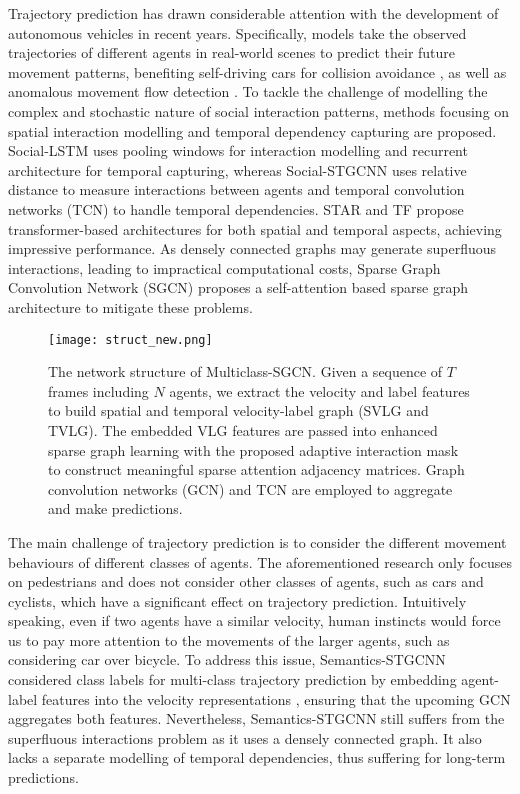 \documentclass{article}
\begin{document}
Trajectory prediction has drawn considerable attention with the development of autonomous vehicles in recent years. Specifically, models take the observed trajectories of different agents in real-world scenes to predict their future movement patterns, benefiting self-driving cars for collision avoidance \cite{liu2021trajectorysurvey}, as well as anomalous movement flow detection \cite{zhou2015dynamic}. To tackle the challenge of modelling the complex and stochastic nature of social interaction patterns,
methods focusing on spatial interaction modelling and temporal dependency capturing are proposed.
Social-LSTM \cite{Alexandre2016lstm} uses pooling windows for interaction modelling and recurrent architecture for temporal capturing, whereas Social-STGCNN \cite{Mohamed2020socialstgcnn} uses relative distance to measure interactions between agents and temporal convolution networks (TCN) \cite{bai2018tcn} to handle temporal dependencies. STAR \cite{YuMa2020Spatio} and TF \cite{giuliari2020Transformer} propose transformer-based \cite{Vaswani2017Transformer} architectures for both spatial and temporal aspects, achieving impressive performance. As densely connected graphs may generate superfluous interactions, leading to impractical computational costs, Sparse Graph Convolution Network (SGCN) \cite{shi2021sgcn} proposes a self-attention based sparse graph architecture to mitigate these problems.


\begin{figure*}
  \texttt{[image: struct\_new.png]}
  \caption{The network structure of Multiclass-SGCN. Given a sequence of $T$ frames including $N$ agents, we extract the velocity and label features to build spatial and temporal velocity-label graph (SVLG and TVLG). The embedded VLG features are passed into enhanced sparse graph learning with the proposed adaptive interaction mask to construct meaningful sparse attention adjacency matrices. Graph convolution networks (GCN) and TCN are employed to aggregate and make predictions.}
  \label{fig:overview}
\end{figure*}



The main challenge of trajectory prediction is to consider the different movement behaviours of different classes of agents. The aforementioned research only focuses on pedestrians and does not consider other classes of agents, such as cars and cyclists, which have a significant effect on trajectory prediction. Intuitively speaking, even if two agents have a similar velocity, human instincts would force us to pay more attention to the movements of the larger agents, such as considering car over bicycle. To address this issue, Semantics-STGCNN \cite{rainbow2021semanticsstgcnn,men21pytorch} considered class labels for multi-class trajectory prediction by embedding agent-label features into the velocity representations \cite{zhang2019semanticskeleton}, ensuring that the upcoming GCN \cite{kipf2016gcn} aggregates both features. Nevertheless, Semantics-STGCNN still suffers from the superfluous interactions problem as it uses a densely connected graph. It also lacks a separate modelling of temporal dependencies, thus suffering for long-term predictions.
\end{document}
